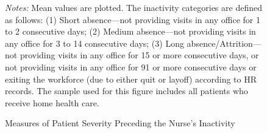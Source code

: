 \documentclass[final,12pt, notitlepage]{article}
\begin{document}
\begin{singlespace}
\graphicspath{ {/Users/kimk13/Dropbox/Wharton/Research/Labor/gph/anhandoff/} }
\begin{figure}[H]
\begin{minipage}{\linewidth}
\centering
{}
{}
{}
\footnotesize
\justify
\emph{Notes:} Mean values are plotted.
The inactivity categories are defined as follows:
(1) Short absence---not providing visits in any office for 1 to 2 consecutive days;
(2) Medium absence---not providing visits in any office for 3 to 14 consecutive days;
(3) Long absence/Attrition---not providing visits in any office for 15 or more consecutive days, or not providing visits in any office for 91 or more consecutive days or exiting the workforce (due to either quit or layoff) according to HR records.
The sample used for this figure includes all patients who receive home health care.
\end{minipage}
\caption[Measures of Patient Severity Preceding the Nurse's Inactivity]%
{Measures of Patient Severity Preceding the Nurse's Inactivity}
\label{fig:severity_byday}
\end{figure}


\end{singlespace}
\end{document}
